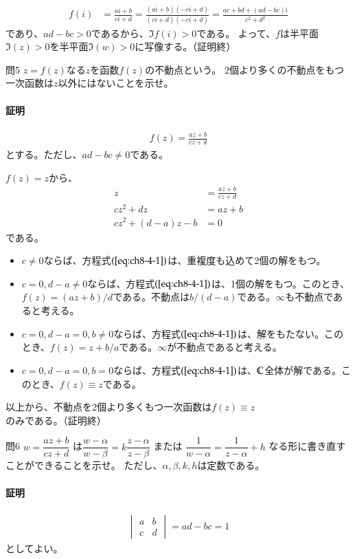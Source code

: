 \begin{align*}
    f(i)&=\frac{ai+b}{ci+d}
    =\frac{(ai+b)(-ci+d)}{(ci+d)(-ci+d)}
    =\frac{ac+bd+(ad-bc)i}{c^2+d^2}
\end{align*}
であり、$ad-bc>0$であるから、$\Im f(i)>0$である。
よって、$f$は半平面$\Im(z)>0$を半平面$\Im(w)>0$に写像する。（証明終）

\newpage
\begin{mysimplebox}{問5}
    $z=f(z)$なる$z$を函数$f(z)$の不動点という。
    2個より多くの不動点をもつ一次函数は$z$以外にはないことを示せ。
\end{mysimplebox}
\paragraph{証明}
\begin{align*}
    f(z)=\frac{az+b}{cz+d}
\end{align*}
とする。ただし、$ad-bc\neq0$である。

$f(z)=z$から、
\begin{align}
    z&=\frac{az+b}{cz+d}\nonumber\\
    cz^2+dz&=az+b\nonumber\\
    cz^2+(d-a)z-b&=0\label{eq:ch8-4-1}
\end{align}
である。
\begin{itemize}
    \item $c\neq0$ならば、方程式$(\ref{eq:ch8-4-1})$は、重複度も込めて2個の解をもつ。
    \item $c=0,d-a\neq0$ならば、方程式$(\ref{eq:ch8-4-1})$は、1個の解をもつ。このとき、$f(z)=(az+b)/d$である。不動点は$b/(d-a)$である。$\infty$も不動点であると考える。
    \item $c=0,d-a=0,b\neq0$ならば、方程式$(\ref{eq:ch8-4-1})$は、解をもたない。このとき、$f(z)=z+b/a$である。$\infty$が不動点であると考える。
    \item $c=0,d-a=0,b=0$ならば、方程式$(\ref{eq:ch8-4-1})$は、$\mathbb{C}$全体が解である。このとき、$f(z)\equiv z$である。
\end{itemize}
以上から、不動点を2個より多くもつ一次函数は$f(z)\equiv z$のみである。（証明終）

\newpage
\begin{mysimplebox}{問6}
    $w=\dfrac{az+b}{cz+d}$
    は$\dfrac{w-\alpha}{w-\beta}=k\dfrac{z-\alpha}{z-\beta}$
    または
    $\dfrac{1}{w-\alpha}=\dfrac{1}{z-\alpha}+h$
    なる形に書き直すことができることを示せ。
    ただし、$\alpha,\beta,k,h$は定数である。
\end{mysimplebox}
\paragraph{証明}
\begin{align*}
    \begin{vmatrix}
        a&b\\
        c&d
    \end{vmatrix}
    =ad-bc=1
\end{align*}
としてよい。

